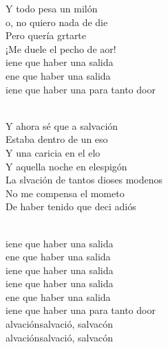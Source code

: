 \documentclass[12pt]{article}
\begin{document}
\begin{multicols*}{2}
\begin{cancion}
                Y todo pesa un milón\\
        \jump
                o, no quiero nada de die\\
                Pero quería grtarte\\
                ¡Me duele el pecho de aor!\\
        \jump
                iene que haber una salida\\
                ene que haber una salida\\
                iene que haber una para tanto door\\\jump\\
                \begin{chorus}%
                Y ahora sé que a salvación\\
                Estaba dentro de un eso\\
                Y una caricia en el elo\\
                Y aquella noche en elespigón\\
        \jump
                La slvación de tantos dioses modenos\\
                No me compensa el mometo\\
                De haber tenido que deci adiós\\
                \end{chorus}%
                \jump\\
                iene que haber una salida\\
                ene que haber una salida\\
                iene que haber una salida\\
        \jump
                iene que haber una salida\\
                ene que haber una salida\\
                iene que haber una para tanto door\\
        \jump
                alvaciónsalvació, salvacón\\
                alvaciónsalvació, salvacón\\
        \end{cancion}%


\end{multicols*}
\end{document}
